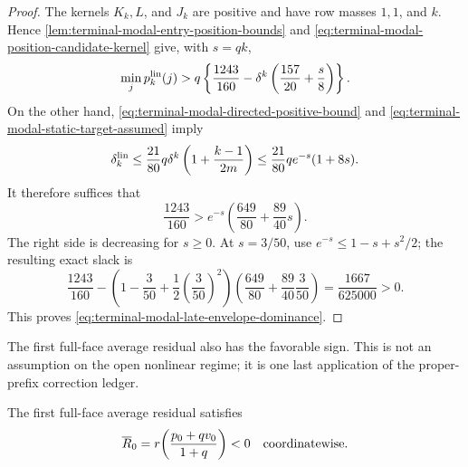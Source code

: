 \begin{proof}
The kernels $K_k,L$, and $J_k$ are positive and have row masses $1,1$, and
$k$.  Hence \cref{lem:terminal-modal-entry-position-bounds} and
\eqref{eq:terminal-modal-position-candidate-kernel} give, with $s=qk$,
\begin{equation}
 \min_jp_k^{\rm lin}(j)
 >q\left\{\frac{1243}{160}
 -\delta^k\left(\frac{157}{20}+\frac{s}{8}\right)\right\}.
 \label{eq:terminal-modal-late-position-lower}
\end{equation}
On the other hand,
\cref{eq:terminal-modal-directed-positive-bound} and
\eqref{eq:terminal-modal-static-target-assumed} imply
\begin{equation}
 \delta_k^{\rm lin}
 \le\frac{21}{80}q\delta^k
       \left(1+\frac{k-1}{2m}\right)
 \le\frac{21}{80}q e^{-s}(1+8s).
 \label{eq:terminal-modal-late-envelope-upper}
\end{equation}
It therefore suffices that
\begin{equation}
 \frac{1243}{160}>
 e^{-s}\left(\frac{649}{80}+\frac{89}{40}s\right).
 \label{eq:terminal-modal-late-scalar-target}
\end{equation}
The right side is decreasing for $s\ge0$.  At $s=3/50$, use
$e^{-s}\le1-s+s^2/2$; the resulting exact slack is
\begin{equation}
 \frac{1243}{160}
 -\left(1-\frac{3}{50}+\frac12\left(\frac{3}{50}\right)^2\right)
  \left(\frac{649}{80}+\frac{89}{40}\frac{3}{50}\right)
 =\frac{1667}{625000}>0.
 \label{eq:terminal-modal-late-rational-slack}
\end{equation}
This proves \eqref{eq:terminal-modal-late-envelope-dominance}.
\end{proof}

The first full-face average residual also has the favorable sign.  This is
not an assumption on the open nonlinear regime; it is one last application
of the proper-prefix correction ledger.

\begin{lemma}
\label{lem:terminal-modal-first-full-average-sign}
The first full-face average residual satisfies
\begin{equation}
 \overline R_0
 =r\!\left(\frac{p_0+qv_0}{1+q}\right)<0
 \quad\hbox{coordinatewise}.
 \label{eq:terminal-modal-first-full-average-sign}
\end{equation}
\end{lemma}


